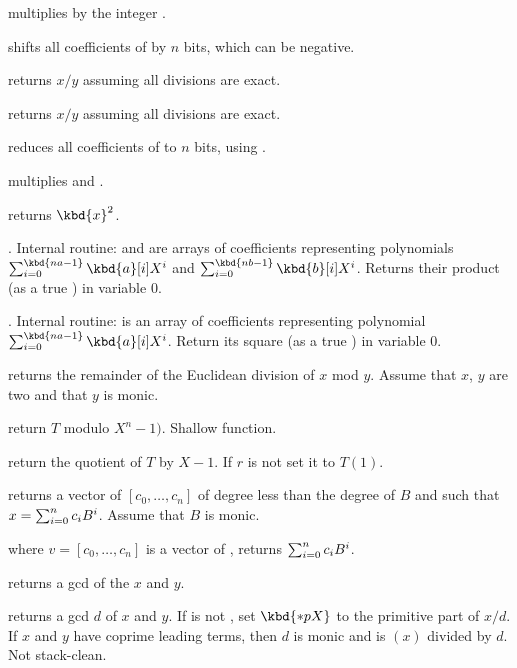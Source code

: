 multiplies  by the integer .

 shifts all coefficients of  by $n$
bits, which can be negative.

 returns $x/y$ assuming all divisions
are exact.

 returns $x/y$ assuming all divisions
are exact.

 reduces all coefficients of  to
$n$ bits, using .

 multiplies  and .

 returns $\kbd{x}^2$.

. Internal routine:
 and  are arrays of coefficients representing polynomials
$\sum_{i = 0}^{\kbd{na-1}} \kbd{a}[i] X^i$ and
$\sum_{i = 0}^{\kbd{nb-1}} \kbd{b}[i] X^i$. Returns their product (as a true
) in variable $0$.

. Internal routine:
 is an array of coefficients representing polynomial
$\sum_{i = 0}^{\kbd{na-1}} \kbd{a}[i] X^i$. Return its square (as a true
) in variable $0$.

 returns the remainder of the Euclidean
division of $x$ mod $y$. Assume that $x$, $y$ are two  and that
$y$ is monic.

 return $T$ modulo $X^n - 1)$. Shallow
function.

 return the quotient of $T$ by $X-1$.
If $r$ is not  set it to $T(1)$.

 returns a vector of 
$[c_0,\ldots,c_n]$ of degree less than the degree of $B$ and such that
$x=\sum_{i=0}^{n}{c_i\*B^i}$. Assume that $B$ is monic.

 where $v=[c_0,\ldots,c_n]$
is a vector of , returns $\sum_{i=0}^{n}{c_i\*B^i}$.

 returns a gcd of the  $x$ and $y$.

 returns a gcd $d$ of $x$ and
$y$. If  is not , set $\kbd{*pX}$ to the primitive part
of $x/d$. If $x$ and $y$ have coprime leading terms, then $d$ is monic and
 is $(x)$ divided by $d$. Not stack-clean.

